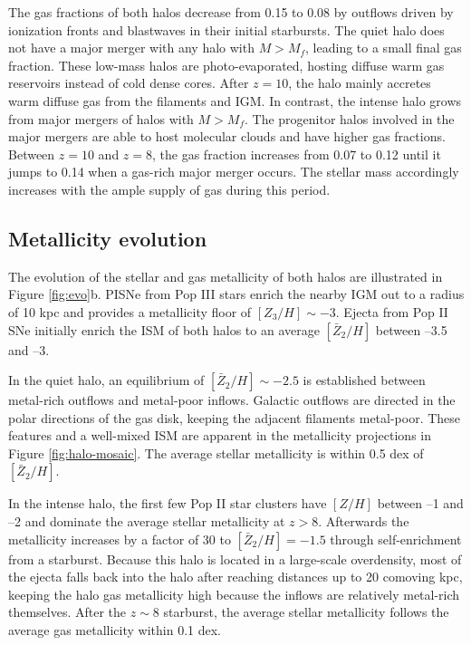 \documentclass[apjl]{emulateapj}
\begin{document}
The gas fractions of both halos decrease from 0.15 to 0.08 by outflows
driven by ionization fronts and blastwaves in their initial
starbursts.  The quiet halo does not have a major merger with any halo
with $M > M_f$, leading to a small final gas fraction.  These low-mass
halos are photo-evaporated, hosting diffuse warm gas reservoirs
instead of cold dense cores.  After $z=10$, the halo mainly accretes
warm diffuse gas from the filaments and IGM.  In contrast, the intense
halo grows from major mergers of halos with $M > M_f$.  The progenitor
halos involved in the major mergers are able to host molecular clouds
and have higher gas fractions.  Between $z=10$ and $z=8$, the gas
fraction increases from 0.07 to 0.12 until it jumps to 0.14 when a
gas-rich major merger occurs.  The stellar mass accordingly increases
with the ample supply of gas during this period.  

\subsection{Metallicity evolution}

The evolution of the stellar and gas metallicity of both halos are
illustrated in Figure \ref{fig:evo}b.  PISNe from Pop III stars enrich
the nearby IGM out to a radius of 10 kpc and provides a metallicity
floor of $[Z_3/H] \sim -3$.  Ejecta from Pop II SNe initially enrich
the ISM of both halos to an average $[\bar{Z}_2/H]$ between --3.5 and
--3.

In the quiet halo, an equilibrium of $[\bar{Z}_2/H] \sim -2.5$ is
established between metal-rich outflows and metal-poor inflows.
Galactic outflows are directed in the polar directions of the gas
disk, keeping the adjacent filaments metal-poor.  These features and a
well-mixed ISM \citep[cf.][]{Wise08_Gal, Greif10} are apparent in the
metallicity projections in Figure \ref{fig:halo-mosaic}.  The average
stellar metallicity is within 0.5 dex of $[\bar{Z}_2/H]$.

In the intense halo, the first few Pop II star clusters have $[Z/H]$
between --1 and --2 and dominate the average stellar metallicity at $z
> 8$.  Afterwards the metallicity increases by a factor of 30 to
$[\bar{Z}_2/H] = -1.5$ through self-enrichment from a starburst.
Because this halo is located in a large-scale overdensity, most of the
ejecta falls back into the halo after reaching distances up to 20
comoving kpc, keeping the halo gas metallicity high because the
inflows are relatively metal-rich themselves.  After the $z \sim 8$
starburst, the average stellar metallicity follows the average gas
metallicity within 0.1 dex.
\end{document}
